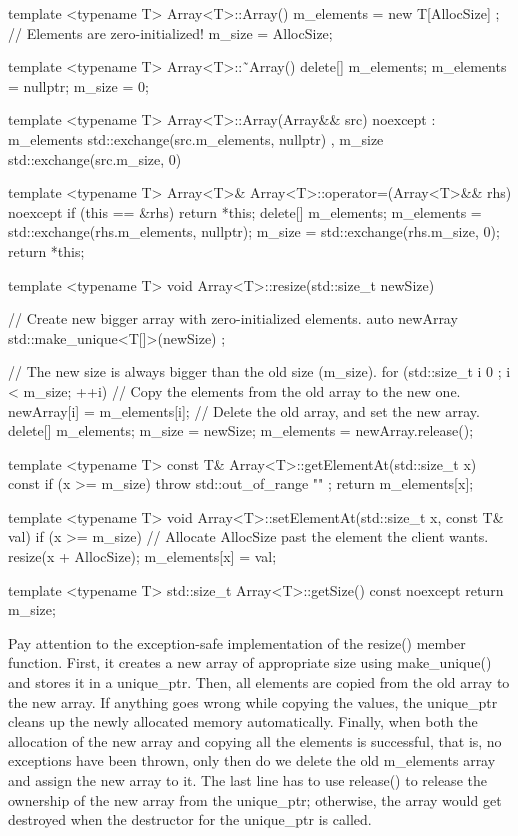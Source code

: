 \begin{cpp}
template <typename T> Array<T>::Array()
{
    m_elements = new T[AllocSize] {}; // Elements are zero-initialized!
    m_size = AllocSize;
}

template <typename T> Array<T>::˜Array()
{
    delete[] m_elements;
    m_elements = nullptr;
    m_size = 0;
}

template <typename T> Array<T>::Array(Array&& src) noexcept
: m_elements { std::exchange(src.m_elements, nullptr) }
, m_size { std::exchange(src.m_size, 0) }
{}

template <typename T> Array<T>& Array<T>::operator=(Array<T>&& rhs) noexcept
{
    if (this == &rhs) { return *this; }
    delete[] m_elements;
    m_elements = std::exchange(rhs.m_elements, nullptr);
    m_size = std::exchange(rhs.m_size, 0);
    return *this;
}

template <typename T> void Array<T>::resize(std::size_t newSize)
{
    // Create new bigger array with zero-initialized elements.
    auto newArray { std::make_unique<T[]>(newSize) };

    // The new size is always bigger than the old size (m_size).
    for (std::size_t i { 0 }; i < m_size; ++i) {
        // Copy the elements from the old array to the new one.
        newArray[i] = m_elements[i];
    }
    // Delete the old array, and set the new array.
    delete[] m_elements;
    m_size = newSize;
    m_elements = newArray.release();
}

template <typename T> const T& Array<T>::getElementAt(std::size_t x) const
{
    if (x >= m_size) { throw std::out_of_range { "" }; }
    return m_elements[x];
}

template <typename T> void Array<T>::setElementAt(std::size_t x, const T& val)
{
    if (x >= m_size) {
        // Allocate AllocSize past the element the client wants.
        resize(x + AllocSize);
    }
    m_elements[x] = val;
}

template <typename T> std::size_t Array<T>::getSize() const noexcept
{
    return m_size;
}
\end{cpp}

Pay attention to the exception-safe implementation of the resize() member function. First, it creates a new array of appropriate size using make\_unique() and stores it in a unique\_ptr. Then, all elements are copied from the old array to the new array. If anything goes wrong while copying the values, the unique\_ptr cleans up the newly allocated memory automatically. Finally, when both the allocation of the new array and copying all the elements is successful, that is, no exceptions have been thrown, only then do we delete the old m\_elements array and assign the new array to it. The last line has to use release() to release the ownership of the new array from the unique\_ptr; otherwise, the array would get destroyed when the destructor for the unique\_ptr is called.

